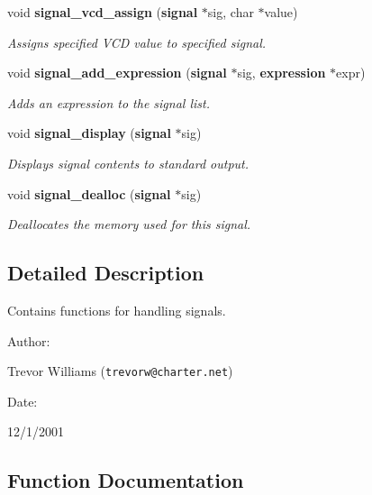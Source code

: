 \begin{CompactItemize}
void {\bf signal\_\-vcd\_\-assign} ({\bf signal} $\ast$sig, char $\ast$value)
\begin{CompactList}\small\item\em Assigns specified VCD value to specified signal.\item\end{CompactList}\item 
void {\bf signal\_\-add\_\-expression} ({\bf signal} $\ast$sig, {\bf expression} $\ast$expr)
\begin{CompactList}\small\item\em Adds an expression to the signal list.\item\end{CompactList}\item 
void {\bf signal\_\-display} ({\bf signal} $\ast$sig)
\begin{CompactList}\small\item\em Displays signal contents to standard output.\item\end{CompactList}\item 
void {\bf signal\_\-dealloc} ({\bf signal} $\ast$sig)
\begin{CompactList}\small\item\em Deallocates the memory used for this signal.\item\end{CompactList}\end{CompactItemize}


\subsection{Detailed Description}
Contains functions for handling signals.



\begin{Desc}
\item[Author: ]\par
Trevor Williams ({\tt trevorw@charter.net}) \end{Desc}
\begin{Desc}
\item[Date: ]\par
12/1/2001\end{Desc}


\subsection{Function Documentation}
